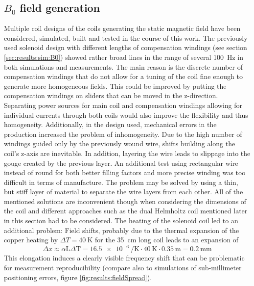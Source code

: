         \subsection{$B_0$ field generation}
        Multiple coil designs of the coils generating the static magnetic field have been considered, simulated, built and tested in the course of this work. The previously used solenoid design with different lengths of compensation windings (see section \ref{sec:results:sim:B0}) showed rather broad lines in the range of several \SI{100}{\hertz} in both simulations and measurements. The main reason is the discrete number of compensation windings that do not allow for a tuning of the coil fine enough to generate more homogeneous fields. This could be improved by putting the compensation windings on sliders that can be moved in the z-direction. Separating power sources for main coil and compensation windings allowing for individual currents through both coils would also improve the flexibility and thus homogeneity. Additionally, in the design used, mechanical errors in the production increased the problem of inhomogeneity. Due to the high number of windings guided only by the previously wound wire, shifts building along the coil's z-axis are inevitable. In addition, layering the wire leads to slippage into the gouge created by the previous layer. An additional test using rectangular wire instead of round for both better filling factors and more precise winding was too difficult in terms of manufacture. The problem may be solved by using a thin, but stiff layer of material to separate the wire layers from each other. All of the mentioned solutions are inconvenient though when considering the dimensions of the coil and different approaches such as the dual Helmholtz coil mentioned later in this section had to be considered.
            The heating of the solenoid coil led to an additional problem: Field shifts, probably due to the thermal expansion of the copper heating by $\Delta T = \SI{40}{\kelvin}$ for the \SI{35}{\centi\meter} long coil leads to an expansion of 
            \begin{equation}
                \Delta x \approx \alpha \mathrm{L}\Delta\mathrm{T}= \SI{16.5e-6}{\per\kelvin}\cdot \SI{40}{\kelvin} \cdot \SI{0.35}{\meter} = \SI{0.2}{\milli\meter}
            \end{equation}
            This elongation induces a clearly visible frequency shift that can be problematic for measurement reproducibility (compare also to simulations of sub-millimeter positioning errors, figure \ref{fig:results:fieldSpread}).
